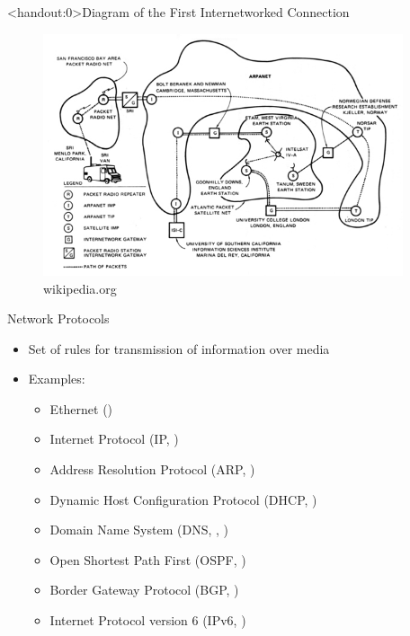 \begin{frame}<handout:0>{Diagram of the First Internetworked Connection}
	\begin{figure}
		\includegraphics[width=300pt]{../common/images/SRI_First_Internetworked_Connection_diagram.jpg}\\
		{\scriptsize wikipedia.org}
	\end{figure}
\end{frame}

\begin{frame}{Network Protocols}
	\begin{itemize}[<+->]
		\item Set of rules for transmission of information over media
		\item Examples:
		\begin{itemize}
			\item Ethernet ()
			\item Internet Protocol (IP, )
			\item Address Resolution Protocol (ARP, )
			\item Dynamic Host Configuration Protocol (DHCP, )
			\item Domain Name System (DNS, , )
			\item Open Shortest Path First (OSPF, )
			\item Border Gateway Protocol (BGP, )
			\item Internet Protocol version 6 (IPv6, )
		\end{itemize}
	\end{itemize}
\end{frame}

